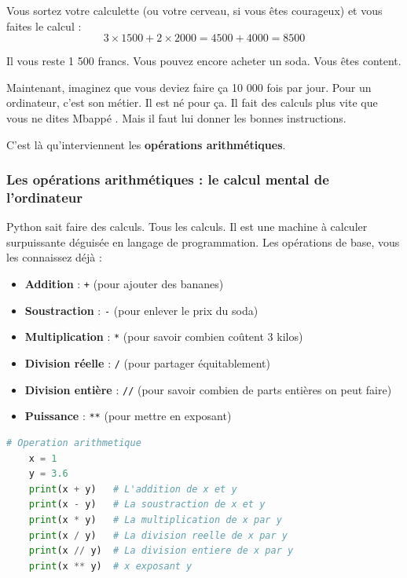 \documentclass[12pt,a4paper]{article}
\begin{document}
Vous sortez votre calculette (ou votre cerveau, si vous êtes courageux) et vous faites le calcul :
\[
3 \times 1500 + 2 \times 2000 = 4500 + 4000 = 8500
\]

Il vous reste 1 500 francs. Vous pouvez encore acheter un soda. Vous êtes content.

Maintenant, imaginez que vous deviez faire ça 10 000 fois par jour. Pour un ordinateur, c'est son métier. Il est né pour ça. Il fait des calculs plus vite que vous ne dites \og Mbappé \fg. Mais il faut lui donner les bonnes instructions.

C'est là qu'interviennent les \textbf{opérations arithmétiques}.

\subsubsection{Les opérations arithmétiques : le calcul mental de l'ordinateur}

Python sait faire des calculs. Tous les calculs. Il est une machine à calculer surpuissante déguisée en langage de programmation. Les opérations de base, vous les connaissez déjà :

\begin{itemize}
	\item [\ding{182}] \textbf{Addition} : \texttt{+} (pour ajouter des bananes)
	\item [\ding{183}] \textbf{Soustraction} : \texttt{-} (pour enlever le prix du soda)
	\item [\ding{184}] \textbf{Multiplication} : \texttt{*} (pour savoir combien coûtent 3 kilos)
	\item [\ding{185}] \textbf{Division réelle} : \texttt{/} (pour partager équitablement)
	\item [\ding{186}] \textbf{Division entière} : \texttt{//} (pour savoir combien de parts entières on peut faire)
	\item [\ding{187}] \textbf{Puissance} : \texttt{**} (pour mettre en exposant)
\end{itemize}

\begin{lstlisting}[language=Python]
	# Operation arithmetique
	x = 1
	y = 3.6
	print(x + y)   # L'addition de x et y
	print(x - y)   # La soustraction de x et y
	print(x * y)   # La multiplication de x par y
	print(x / y)   # La division reelle de x par y
	print(x // y)  # La division entiere de x par y
	print(x ** y)  # x exposant y
\end{lstlisting}
\end{document}
